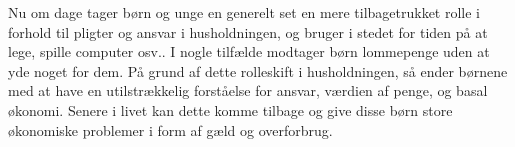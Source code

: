 Nu om dage tager børn og unge en generelt set en mere tilbagetrukket rolle i forhold til pligter og ansvar i husholdningen, og bruger i stedet for tiden på at lege, spille computer osv.. I nogle tilfælde modtager børn lommepenge uden at yde noget for dem.\cite{Boerneliv} På grund af dette rolleskift i husholdningen, så ender børnene med at have en utilstrækkelig forståelse for ansvar, værdien af penge, og basal økonomi.\cite{BusinessDK2} Senere i livet kan dette komme tilbage og give disse børn store økonomiske problemer i form af gæld og overforbrug.